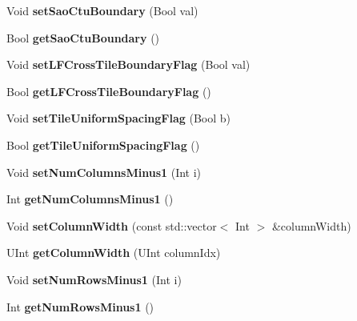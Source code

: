 \begin{DoxyCompactItemize}
Void {\bfseries set\+Sao\+Ctu\+Boundary} (Bool val)
\item 
\mbox{\label{class_t_enc_cfg_a50e958fa612efd7e86d20c75f1e2fe55}} 
Bool {\bfseries get\+Sao\+Ctu\+Boundary} ()
\item 
\mbox{\label{class_t_enc_cfg_ae1238b8f0992eebff238e972793c2230}} 
Void {\bfseries set\+L\+F\+Cross\+Tile\+Boundary\+Flag} (Bool val)
\item 
\mbox{\label{class_t_enc_cfg_ad5ed5ef8b164feebe98050762653f7dc}} 
Bool {\bfseries get\+L\+F\+Cross\+Tile\+Boundary\+Flag} ()
\item 
\mbox{\label{class_t_enc_cfg_a623f65d0d6b0a86312728595e484e3f3}} 
Void {\bfseries set\+Tile\+Uniform\+Spacing\+Flag} (Bool b)
\item 
\mbox{\label{class_t_enc_cfg_a52a740829a2c9309a266e612d0f94fa9}} 
Bool {\bfseries get\+Tile\+Uniform\+Spacing\+Flag} ()
\item 
\mbox{\label{class_t_enc_cfg_a10808ad542bb2bd654fe497fdb0983f1}} 
Void {\bfseries set\+Num\+Columns\+Minus1} (Int i)
\item 
\mbox{\label{class_t_enc_cfg_ae5052a3b7c797664f7d51382c25a6c58}} 
Int {\bfseries get\+Num\+Columns\+Minus1} ()
\item 
\mbox{\label{class_t_enc_cfg_a3805c910d90af7c934287ca618782768}} 
Void {\bfseries set\+Column\+Width} (const std\+::vector$<$ Int $>$ \&column\+Width)
\item 
\mbox{\label{class_t_enc_cfg_aa93669295ec83936437ae5995474368b}} 
U\+Int {\bfseries get\+Column\+Width} (U\+Int column\+Idx)
\item 
\mbox{\label{class_t_enc_cfg_a8c0d4b92e136c45e04d5093ab67e1bbb}} 
Void {\bfseries set\+Num\+Rows\+Minus1} (Int i)
\item 
\mbox{\label{class_t_enc_cfg_a8bdedd0309be7f177d70ba0b9b175426}} 
Int {\bfseries get\+Num\+Rows\+Minus1} ()

\end{DoxyCompactItemize}
